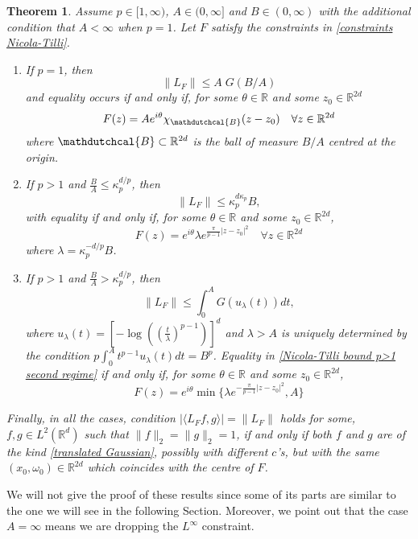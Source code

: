 \documentclass[corpo=11pt, stile=classica, tipotesi=custom,
greek, evenboxes, english]{toptesi}
\numberwithin{equation}{chapter}
\newtheorem{teo}{Theorem}[chapter] %
\theoremstyle{remark}
\newcommand{\R}{\mathbb{R}} %
\begin{document}
\begin{teo}\label{Nicola Tilli norm theorem}
	Assume $p \in [1,\infty)$, $A \in (0, \infty]$ and $B \in (0,\infty)$ with the additional condition that $A < \infty$ when $p=1$. Let $F$ satisfy the constraints in \eqref{constraints Nicola-Tilli}.
	\begin{enumerate}[label=(\roman*)]
		\item If $p=1$, then
		\begin{equation}\label{Nicola-Tilli bound p=1}
			\|L_F\| \leq A\;G(B/A)
		\end{equation}
		and equality occurs if and only if, for some $\theta \in \R$ and some $z_0 \in \R^{2d}$
		\begin{equation}\label{Nicola-Tilli maximal function p=1}
			F(z) = A e^{i\theta} \chi_{\mathdutchcal{B}} (z-z_0) \quad \forall z \in \R^{2d}
		\end{equation}
		where $\mathdutchcal{B} \subset \R^{2d}$ is the ball of measure $B/A$ centred at the origin.
		
		\item If $p>1$ and $\frac{B}{A} \leq \kappa_p^{d/p}$, then
		\begin{equation}\label{Nicola-Tilli bound p>1 first regime}
			\|L_F\| \leq \kappa_p^{d \kappa_p}B,
		\end{equation}
		with equality if and only if, for some $\theta \in \R$ and some $z_0 \in \R^{2d}$,
		\begin{equation}\label{Nicola-Tilli maximal function p>1 first regime}
			F(z) = e^{i \theta} \lambda e^{\frac{\pi}{p-1}|z-z_0|^2} \quad \forall z \in \R^{2d}
		\end{equation}
		where $\lambda = \kappa_p^{-d/p}B$.\label{Nicola-Tilli norm theorem case 2}	
		\item If $p>1$ and $\frac{B}{A} > \kappa_p^{d/p}$, then
		\begin{equation}\label{Nicola-Tilli bound p>1 second regime}
			\|L_F\| \leq \int_{0}^{A} G(u_{\lambda}(t))dt,
		\end{equation}
		where $u_{\lambda}(t) = \left[-\log\left(\left(\frac{t}{\lambda}\right)^{p-1}\right) \right]^d$ and $\lambda>A$ is uniquely determined by the condition $p\int_{0}^{A} t^{p-1}u_{\lambda}(t)dt = B^p$. Equality in \eqref{Nicola-Tilli bound p>1 second regime} if and only if, for some $\theta \in \R$ and some $z_0 \in \R^{2d}$,
		\begin{equation}\label{Nicola-Tilli maximal function p>1 second regime}
			F(z) = e^{i\theta} \min \{ \lambda e^{-\frac{\pi}{p-1}|z-z_0|^2}, A \}
		\end{equation}
	\end{enumerate}
	Finally, in all the cases, condition $|\langle L_F f,g \rangle| = \|L_F\|$ holds for some, $f,g \in L^2(\R^d)$ such that $\|f\|_2 = \|g\|_2 = 1$, if and only if both $f$ and $g$ are of the kind \eqref{translated Gaussian}, possibly with different $c$'s, but with the same $(x_0,\omega_0) \in \R^{2d}$ which coincides with the centre of $F$.
\end{teo}
We will not give the proof of these results since some of its parts are similar to the one we will see in the following Section. Moreover, we point out that the case $A=
\infty$ means we are dropping the $L^{\infty}$ constraint.
\end{document}

